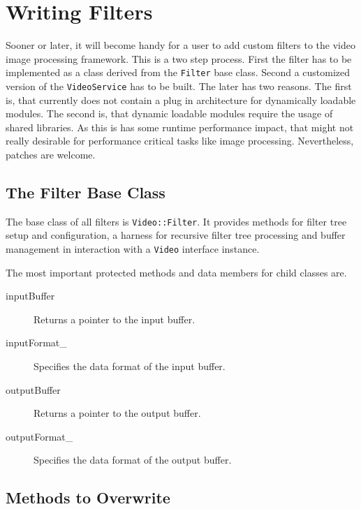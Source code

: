 
\label{lst:VideoExample}

\section{Writing Filters}

Sooner or later, it will become handy for a user to add 
custom filters to the video image processing framework. This is a two
step process. First the filter has to be implemented as a class
derived from the {\tt Filter} base class. Second a customized version
of the {\tt VideoService} has to be built. The later has two
reasons. The first is, that \miro currently does not contain a plug in
architecture for dynamically loadable modules. The second is, that
dynamic loadable modules require the usage of shared libraries. As
this is has some runtime performance impact, that might not really
desirable for performance critical tasks like image
processing. Nevertheless, patches are welcome.

\subsection{The Filter Base Class}

The base class of all filters is {\tt Video::Filter}. It provides
methods for filter tree setup and configuration, a harness for
recursive filter tree processing and buffer management in interaction
with a {\tt Video} interface instance.

The most important protected methods and data members for child classes are.
\begin{description}
\item[inputBuffer] Returns a pointer to the input buffer.
\item[inputFormat\_] Specifies the data format of the input buffer.
\item[outputBuffer] Returns a pointer to the output buffer.
\item[outputFormat\_] Specifies the data format of the output buffer.
\end{description}

\subsection{Methods to Overwrite}

